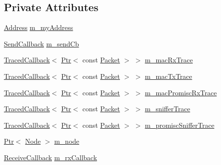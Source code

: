 \subsection*{Private Attributes}
\begin{DoxyCompactItemize}
\item 
\hyperlink{classns3_1_1Address}{Address} \hyperlink{classns3_1_1VirtualNetDevice_ac101b023db43fd70e2498a3b58b456d3}{m\+\_\+my\+Address}
\item 
\hyperlink{classns3_1_1VirtualNetDevice_aebf725ef61f43759033989504a83dd7f}{Send\+Callback} \hyperlink{classns3_1_1VirtualNetDevice_af7be2e7f02d269b54b88a9e396a3fcc4}{m\+\_\+send\+Cb}
\item 
\hyperlink{classns3_1_1TracedCallback}{Traced\+Callback}$<$ \hyperlink{classns3_1_1Ptr}{Ptr}$<$ const \hyperlink{classns3_1_1Packet}{Packet} $>$ $>$ \hyperlink{classns3_1_1VirtualNetDevice_a434af9b19b144c539ab06deec0ac5125}{m\+\_\+mac\+Rx\+Trace}
\item 
\hyperlink{classns3_1_1TracedCallback}{Traced\+Callback}$<$ \hyperlink{classns3_1_1Ptr}{Ptr}$<$ const \hyperlink{classns3_1_1Packet}{Packet} $>$ $>$ \hyperlink{classns3_1_1VirtualNetDevice_af893adb92d8bef8af0b47a3a798a2003}{m\+\_\+mac\+Tx\+Trace}
\item 
\hyperlink{classns3_1_1TracedCallback}{Traced\+Callback}$<$ \hyperlink{classns3_1_1Ptr}{Ptr}$<$ const \hyperlink{classns3_1_1Packet}{Packet} $>$ $>$ \hyperlink{classns3_1_1VirtualNetDevice_a978beda53d5a1309d1fff0cbfb3137b6}{m\+\_\+mac\+Promisc\+Rx\+Trace}
\item 
\hyperlink{classns3_1_1TracedCallback}{Traced\+Callback}$<$ \hyperlink{classns3_1_1Ptr}{Ptr}$<$ const \hyperlink{classns3_1_1Packet}{Packet} $>$ $>$ \hyperlink{classns3_1_1VirtualNetDevice_a590ab436f1261e3e1e52128678026023}{m\+\_\+sniffer\+Trace}
\item 
\hyperlink{classns3_1_1TracedCallback}{Traced\+Callback}$<$ \hyperlink{classns3_1_1Ptr}{Ptr}$<$ const \hyperlink{classns3_1_1Packet}{Packet} $>$ $>$ \hyperlink{classns3_1_1VirtualNetDevice_a18f48204e84161b3e3472ee0af08bbfe}{m\+\_\+promisc\+Sniffer\+Trace}
\item 
\hyperlink{classns3_1_1Ptr}{Ptr}$<$ \hyperlink{classns3_1_1Node}{Node} $>$ \hyperlink{classns3_1_1VirtualNetDevice_a152f05be787bb166a37830a919f2a975}{m\+\_\+node}
\item 
\hyperlink{classns3_1_1NetDevice_ad5e5e1ca187472bc2ba99575d8def568}{Receive\+Callback} \hyperlink{classns3_1_1VirtualNetDevice_adf4e9569cfa5ae6051c76cb4ddda1c14}{m\+\_\+rx\+Callback}

\end{DoxyCompactItemize}
